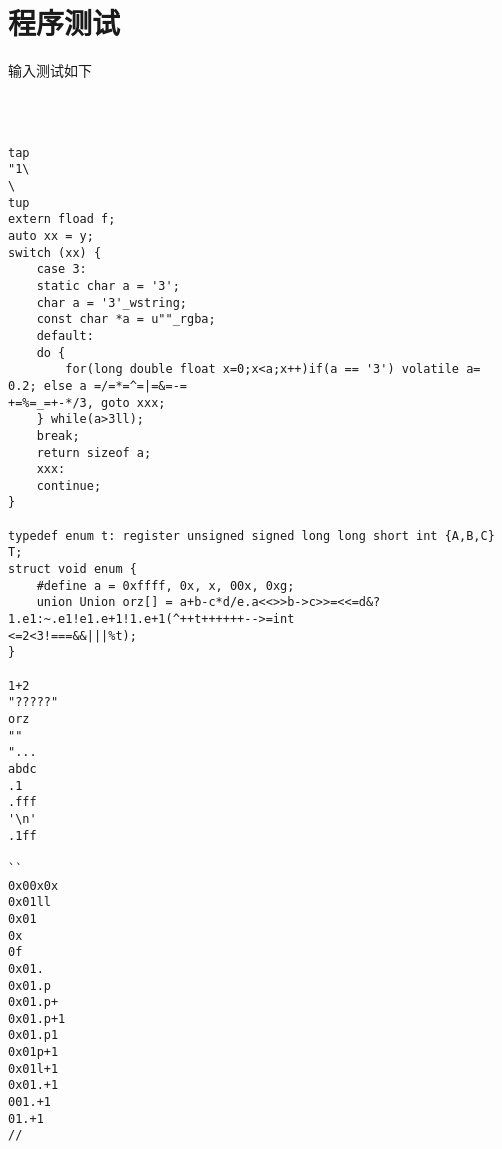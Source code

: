 \documentclass[UTF8]{ctexart}
\begin{document}
\section{程序测试}
输入测试如下
{\firacode
\begin{lstlisting}



tap
"1\
\
tup
extern fload f;
auto xx = y;
switch (xx) {
    case 3:
    static char a = '3';
    char a = '3'_wstring;
    const char *a = u""_rgba;
    default:
    do {
        for(long double float x=0;x<a;x++)if(a == '3') volatile a= 0.2; else a =/=*=^=|=&=-=
+=%=_=+-*/3, goto xxx;
    } while(a>3ll);
    break;
    return sizeof a;
    xxx:
    continue;
}

typedef enum t: register unsigned signed long long short int {A,B,C} T;
struct void enum {
    #define a = 0xffff, 0x, x, 00x, 0xg;
    union Union orz[] = a+b-c*d/e.a<<>>b->c>>=<<=d&?1.e1:~.e1!e1.e+1!1.e+1(^++t++++++-->=int
<=2<3!===&&|||%t);
}

1+2
"?????"
orz
""
"...
abdc
.1
.fff
'\n'
.1ff

``
0x00x0x
0x01ll
0x01
0x
0f
0x01.
0x01.p
0x01.p+
0x01.p+1
0x01.p1
0x01p+1
0x01l+1
0x01.+1
001.+1
01.+1
//
\end{lstlisting}
}
\end{document}
